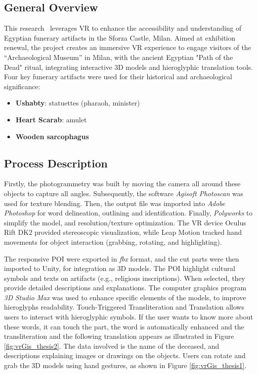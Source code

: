 \subsection*{General Overview}

This research~\cite{gonizzi20153d} leverages \gls{VR} to enhance the accessibility and understanding of Egyptian funerary artifacts in the Sforza Castle, Milan. 
Aimed at exhibition renewal, the project creates an immersive \gls{VR} experience to engage visitors of the “Archaeological Museum” in Milan, with the ancient Egyptian "Path of the Dead" ritual, integrating interactive \gls{3D} models and hieroglyphic translation tools. Four key funerary artifacts were used for their historical and archaeological significance:
\begin{itemize}
  \item \textbf{Ushabty}: statuettes (pharaoh, minister)
  \item \textbf{Heart Scarab}: amulet
  \item \textbf{Wooden sarcophagus} 
\end{itemize}



\subsection*{Process Description}

Firstly, the photogrammetry was built by moving the camera all around these objects to capture all angles. Subsequently, the software \textit{Agisoft Photoscan} was used for texture blending. Then, the output file was imported into \textit{Adobe Photoshop} for word delineation, outlining and identification. 
Finally, \textit{Polyworks} to simplify the model, and resolution/texture optimization.
The \gls{VR} device Oculus Rift DK2 provided stereoscopic visualization, while Leap Motion tracked hand movements for object interaction (grabbing, rotating, and highlighting).

The responsive \gls{POI} were exported in \textit{fbx} format, and the cut parts were then imported to Unity, for integration as \gls{3D} models.
The \gls{POI} highlight cultural symbols and texts on artifacts (e.g., religious inscriptions). When selected, they provide detailed descriptions and explanations.
The computer graphics program \textit{\gls{3D} Studio Max} was used to enhance specific elements of the models, to improve hieroglyphs readability.
Touch-Triggered Transliteration and Translation allows users to interact with hieroglyphic symbols. If the user wants to know more about these words, it can touch the part, the word is automatically enhanced and the transliteration and the following translation appears as illustrated in Figure \ref{fig:vrGis_thesis2}. The data involved is the name of the deceased, and descriptions explaining images or drawings on the objects.
Users can rotate and grab the \gls{3D} models using hand gestures, as shown in Figure \ref{fig:vrGis_thesis1}.


